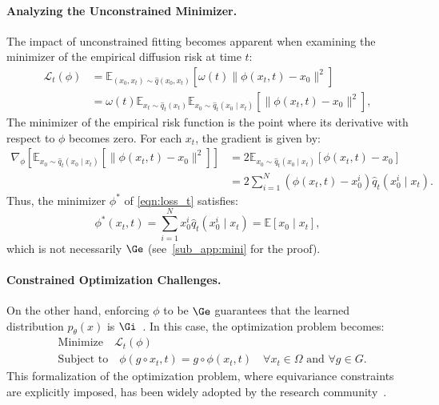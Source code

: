 

\paragraph{Analyzing the Unconstrained Minimizer.} The impact of unconstrained fitting becomes apparent when examining the minimizer of the empirical diffusion risk at time \(t\):
\begin{align}
    \mathcal{L}_t(\phi) &= \mathbb{E}_{(x_0, x_t) \sim \hat{q}(x_0, x_t)} \left[ \omega(t) \| \phi(x_t, t) - x_0 \|^2 \right] \nonumber \\
    &= \omega(t) \mathbb{E}_{x_t \sim \hat{q}_t(x_t)} \mathbb{E}_{x_0 \sim \hat{q}_t(x_0 \mid x_t)} \left[ \| \phi(x_t, t) - x_0 \|^2 \right] ,
    \label{eqn:loss_t}
\end{align}
The minimizer of the empirical risk function is the point where its derivative with respect to \( \phi \) becomes zero. For each \( x_t \), the gradient is given by:  
\begin{align}
    \nabla_\phi \left[ \mathbb{E}_{x_0 \sim \hat{q}_t(x_0 \mid x_t)} \left[ \| \phi(x_t, t) - x_0 \|^2 \right] \right] &= 2 \mathbb{E}_{x_0 \sim \hat{q}_t(x_0 \mid x_t)} \left[  \phi(x_t, t) - x_0  \right] \nonumber \\
    &= 2 \sum_{i=1}^N (\phi(x_t, t) - x_0^i) \hat{q}_t(x_0^i \mid x_t) . \nonumber
\end{align}  
Thus, the minimizer \( \phi^* \) of \eqref{eqn:loss_t} satisfies:  
\begin{equation}
    \phi^*(x_t, t) = \sum_{i=1}^N x_0^i \hat{q}_t(x_0^i \mid x_t) = \mathbb{E}[x_0 \mid x_t] ,
\end{equation}
which is not necessarily \( \Ge \) (see~\cref{sub_app:mini} for the proof). 

\paragraph{Constrained Optimization Challenges.} On the other hand, enforcing \( \phi \) to be \( \Ge \) guarantees that the learned distribution \( p_\theta(x) \) is \( \Gi \)~. In this case, the optimization problem becomes:
\begin{align} 
\label{eqn:constraint_problem_}
&\text{Minimize} \quad \mathcal{L}_t(\phi)  \\
&\text{Subject to} \quad \phi(g \circ x_t, t) = g \circ \phi(x_t, t) \quad \forall x_t \in \Omega \text{ and } \forall g \in G . 
\end{align}
This formalization of the optimization problem, where equivariance constraints are explicitly imposed, has been widely adopted by the research community~.

